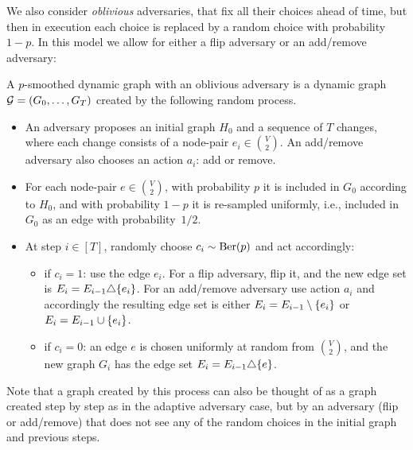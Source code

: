 \documentclass[letter,11pt]{article}
\begin{document}
We also consider \emph{oblivious} adversaries, that fix all their choices ahead of time, but then in execution each choice is replaced by a random choice with probability $1-p$. In this model we allow for either a flip adversary or an add/remove adversary:

\begin{definition}
    A $p$-smoothed dynamic graph with an oblivious adversary
    is a dynamic graph $\mathcal{G} = (G_0,\dots,G_T)$ created by the following random process.
    \begin{itemize}
        \item An adversary proposes 
        an initial graph $H_0$ and a sequence of $T$ changes, where each change consists of a node-pair $e_i\in \binom{V}{2}$.     
        An add/remove adversary also chooses an action $a_i$: add or remove.

        \item 
        For each node-pair $e\in \binom{V}{2}$, 
        with probability $p$ it is included in $G_0$ according to $H_0$, and 
         with probability $1-p$ it is re-sampled uniformly, i.e., included in $G_0$ as an edge with probability~$1/2$.

        
        \item At step $i\in [T]$, randomly choose $c_i\sim \bernoulli{p}$ and act accordingly:
        \begin{itemize}
            \item if $c_i=1$: use the edge $e_i$.
            For a flip adversary, flip it, and the new edge set is $E_i = E_{i-1} \triangle \{e_i\}$.
            For an add/remove adversary use action $a_i$ and accordingly the resulting edge set is either $E_i = E_{i-1} \setminus \{e_i\}$ or $E_i = E_{i-1} \cup \{e_i\}$.

            \item if $c_i=0$: an edge $e$ is chosen uniformly at random from $\binom{V}{2}$, and the new graph $G_i$ has the edge set $E_i = E_{i-1} \triangle \{e\}$.
        \end{itemize}
    \end{itemize}
\end{definition}

Note that a graph created by this process can also be thought of as a graph created step by step as in the adaptive adversary case, but by an adversary (flip or add/remove) that does not see any of the random choices in the initial graph and previous steps.
\end{document}
